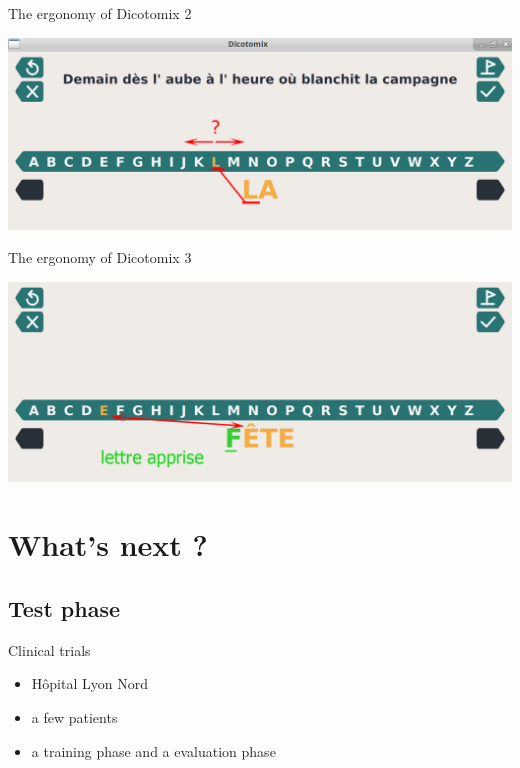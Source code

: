 \documentclass[graphics]{beamer}
\begin{document}
\begin{frame}{The ergonomy of Dicotomix 2}
	\begin{center}
		\includegraphics[scale=0.2]{example1}
	\end{center}
\end{frame}

\begin{frame}{The ergonomy of Dicotomix 3}
	\begin{center}
		\includegraphics[scale=0.2]{encours}
	\end{center}
\end{frame}

\section{What's next ?}
\subsection{Test phase}
\begin{frame}{Clinical trials}
	\begin{center}
		\begin{itemize}
			\item Hôpital Lyon Nord %
			\item a few patients
			\item a training phase and a evaluation phase %
		\end{itemize}
	\end{center}
\end{frame}
\end{document}
